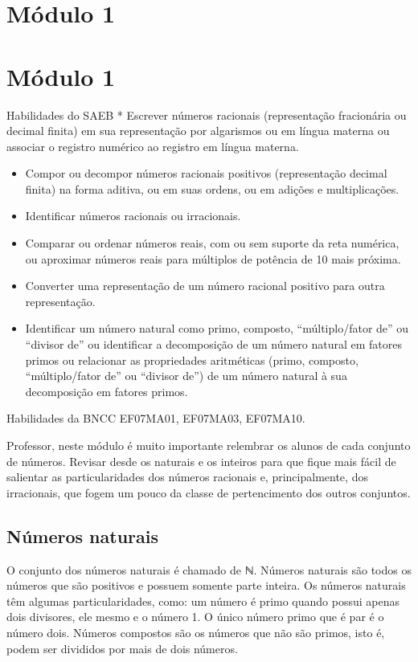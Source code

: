
\chapter{Módulo 1}
\chapter{Módulo 1}


Habilidades do SAEB * Escrever números racionais (representação
fracionária ou decimal finita) em sua representação por algarismos ou em
língua materna ou associar o registro numérico ao registro em língua
materna.



\begin{itemize}
\item
  Compor ou decompor números racionais positivos (representação decimal
  finita) na forma aditiva, ou em suas ordens, ou em adições e
  multiplicações.
\item
  Identificar números racionais ou irracionais.
\item
  Comparar ou ordenar números reais, com ou sem suporte da reta
  numérica, ou aproximar números reais para múltiplos de potência de 10
  mais próxima.
\item
  Converter uma representação de um número racional positivo para outra
  representação.
\item
  Identificar um número natural como primo, composto, ``múltiplo/fator
  de'' ou ``divisor de'' ou identificar a decomposição de um número
  natural em fatores primos ou relacionar as propriedades aritméticas
  (primo, composto, ``múltiplo/fator de'' ou ``divisor de'') de um
  número natural à sua decomposição em fatores primos.
\end{itemize}

Habilidades da BNCC EF07MA01, EF07MA03, EF07MA10.

Professor, neste módulo é muito importante relembrar os alunos de cada
conjunto de números. Revisar desde os naturais e os inteiros para que
fique mais fácil de salientar as particularidades dos números racionais
e, principalmente, dos irracionais, que fogem um pouco da classe de
pertencimento dos outros conjuntos.

\section{Números naturais}

O conjunto dos números naturais é chamado de ℕ. Números naturais são
todos os números que são positivos e possuem somente parte inteira. Os
números naturais têm algumas particularidades, como: um número é primo
quando possui apenas dois divisores, ele mesmo e o número 1. O único
número primo que é par é o número dois. Números compostos são os números
que não são primos, isto é, podem ser divididos por mais de dois
números.

